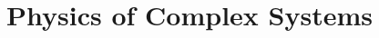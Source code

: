 \documentclass[12pt]{article}
\title{Physics of Complex Systems}
\author{}
\date{}
\begin{document}
\maketitle
\tableofcontents
\pagebreak


\end{document}
